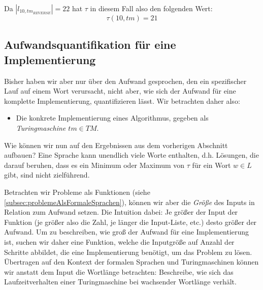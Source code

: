 Da $|l_{10,tm_{REVERSE}}| = 22$ hat $\tau$ in diesem Fall also den folgenden Wert:
\[
\tau(10,tm) = 21
\]

\subsection{Aufwandsquantifikation für eine Implementierung}

Bisher haben wir aber nur über den Aufwand gesprochen,
den ein spezifischer Lauf auf einem Wort verursacht,
nicht aber,
wie sich der Aufwand für eine komplette Implementierung, quantifizieren lässt. 
Wir betrachten daher also:
\begin{itemize}
    \item Die konkrete Implementierung eines Algorithmus,
        gegeben als \emph{Turingmaschine $tm \in TM$}.
\end{itemize}

Wie können wir nun auf den Ergebnissen aus dem vorherigen Abschnitt aufbauen?
Eine Sprache kann unendlich viele Worte enthalten,
d.h. Lösungen, die darauf beruhen,
dass es ein Minimum oder Maximum von $\tau$ für ein Wort $w \in L$ gibt,
sind nicht zielführend.

Betrachten wir Probleme als Funktionen (siehe \autoref{subsec:problemeAlsFormaleSprachen}),
können wir aber die \emph{Größe} des Inputs in Relation zum Aufwand setzen.
Die Intuition dabei:
Je größer der Input der Funktion (je größer also die Zahl,
je länger die Input-Liste, etc.)
desto größer der Aufwand.
Um zu beschreiben,
wie groß der Aufwand für eine Implementierung ist,
suchen wir daher eine Funktion,
welche die Inputgröße auf Anzahl der Schritte abbildet,
die eine Implementierung benötigt,
um das Problem zu lösen.
Übertragen auf den Kontext der formalen Sprachen und Turingmaschinen
können wir anstatt dem Input die Wortlänge betrachten:
Beschreibe, wie sich das Laufzeitverhalten einer Turingmaschine 
bei wachsender Wortlänge verhält.

